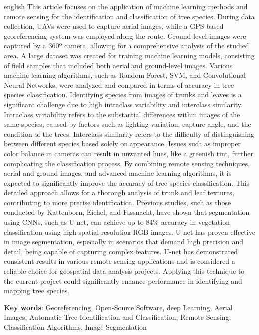 \documentclass[
    12pt,                   %
    openright,              %
    oneside,                %
    a4paper,                %
    sumario=tradicional,    %
    english,                %
    brazil,                 %
    ]{abntex2}
\begin{document}
\begin{resumo}[Abstract]
\begin{otherlanguage*}{english}
   \noindent
    This article focuses on the application of machine learning methods and remote sensing for the identification and classification of tree species. During data collection, UAVs were used to capture aerial images, while a GPS-based georeferencing system was employed along the route. Ground-level images were captured by a 360º camera, allowing for a comprehensive analysis of the studied area. A large dataset was created for training machine learning models, consisting of field samples that included both aerial and ground-level images. Various machine learning algorithms, such as Random Forest, SVM, and Convolutional Neural Networks, were analyzed and compared in terms of accuracy in tree species classification. Identifying species from images of trunks and leaves is a significant challenge due to high intraclass variability and interclass similarity. Intraclass variability refers to the substantial differences within images of the same species, caused by factors such as lighting variation, capture angle, and the condition of the trees. Interclass similarity refers to the difficulty of distinguishing between different species based solely on appearance. Issues such as improper color balance in cameras can result in unwanted hues, like a greenish tint, further complicating the classification process. By combining remote sensing techniques, aerial and ground images, and advanced machine learning algorithms, it is expected to significantly improve the accuracy of tree species classification. This detailed approach allows for a thorough analysis of trunk and leaf textures, contributing to more precise identification. Previous studies, such as those conducted by Kattenborn, Eichel, and Fassnacht, have shown that segmentation using CNNs, such as U-net, can achieve up to 84\% accuracy in vegetation classification using high spatial resolution RGB images. U-net has proven effective in image segmentation, especially in scenarios that demand high precision and detail, being capable of capturing complex features. U-net has demonstrated consistent results in various remote sensing applications and is considered a reliable choice for geospatial data analysis projects. Applying this technique to the current project could significantly enhance performance in identifying and mapping tree species.
   \vspace{\onelineskip}

   \noindent
   \textbf{Key words}: Georeferencing,
        Open-Source Software,
        deep Learning,
        Aerial Images,
        Automatic Tree Identification and Classification,
        Remote Sensing,
        Classification Algorithms,
        Image Segmentation
 \end{otherlanguage*}
\end{resumo}
\end{document}
